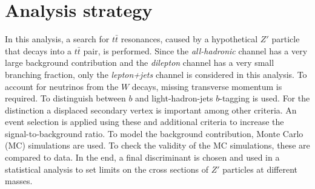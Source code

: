 \section{Analysis strategy}
\label{sec:Durchführung}
In this analysis, a search for $t\bar{t}$ resonances, caused by a hypothetical $Z\prime$ particle that decays into a $t\bar{t}$ pair, is performed. Since the \textit{all-hadronic} channel has a very large background contribution and the \textit{dilepton} channel has a very small branching fraction, only the \textit{lepton+jets} channel is considered in this analysis.
To account for neutrinos from the $W$ decays, missing transverse momentum is required. To distinguish between $b$ and light-hadron-jets
$b$-tagging is used. For the distinction a displaced secondary vertex is important among other criteria. An event selection is applied using these and additional criteria to increase the signal-to-background ratio. To model the background contribution, Monte Carlo (MC) simulations are used. To check the validity of the MC simulations, these are compared to data. In the end, a final discriminant is chosen and used in a statistical analysis to set limits on the cross sections of $Z\prime$ particles at different masses.
